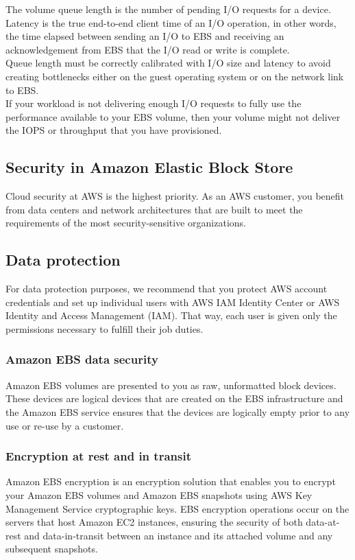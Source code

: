 \documentclass[12pt, letterpaper, twoside]{article}
\begin{document}
The volume queue length is the number of pending I/O requests for a device. Latency is the true end-to-end client time of an I/O operation, 
in other words, the time elapsed between sending an I/O to EBS and receiving an acknowledgement from EBS that the I/O read or write is 
complete.\\ 
Queue length must be correctly calibrated with I/O size and latency to avoid creating bottlenecks either on the guest operating system or 
on the network link to EBS.\\
If your workload is not delivering enough I/O requests to fully use the performance available to your EBS volume, then your volume might 
not deliver the IOPS or throughput that you have provisioned.\\

\subsection{Security in Amazon Elastic Block Store}
Cloud security at AWS is the highest priority. As an AWS customer, you benefit from data centers and network architectures that are built 
to meet the requirements of the most security-sensitive organizations.\\

\subsection{Data protection}
For data protection purposes, we recommend that you protect AWS account credentials and set up individual users with AWS IAM Identity 
Center or AWS Identity and Access Management (IAM). That way, each user is given only the permissions necessary to fulfill their job duties.\\

\subsubsection{Amazon EBS data security}
Amazon EBS volumes are presented to you as raw, unformatted block devices. These devices are logical devices that are created on the EBS 
infrastructure and the Amazon EBS service ensures that the devices are logically empty prior to any use or re-use by a customer.\\

\subsubsection{Encryption at rest and in transit}
Amazon EBS encryption is an encryption solution that enables you to encrypt your Amazon EBS volumes and Amazon EBS snapshots using AWS Key 
Management Service cryptographic keys. EBS encryption operations occur on the servers that host Amazon EC2 instances, ensuring the security 
of both data-at-rest and data-in-transit between an instance and its attached volume and any subsequent snapshots.\\
\end{document}
